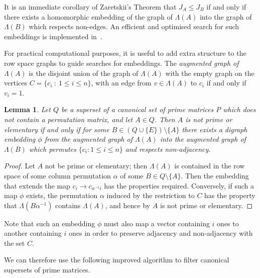 \documentclass[11pt]{article}
\newtheorem{lemma}[thm]{Lemma}
\numberwithin{equation}{section}
\renewcommand{\to}{\longrightarrow}
\newcommand{\RowS}{\Lambda}
\begin{document}
It is an immediate corollary of Zaretskii's Theorem that $J_A \leq J_B$ if and
only if there exists a homomorphic embedding of the graph of $\RowS(A)$ into the
graph of $\RowS(B)$ which respects non-edges. An efficient and optimised search
for such embeddings is implemented in~\cite{Digraphs2020aa}.

For practical computational purposes, it is useful to add extra structure to the
row space graphs to guide searches for embeddings. The \emph{augmented graph of
  $\RowS(A)$} is the disjoint union of the graph of $\RowS(A)$ with the empty
graph on the vertices $C = \{c_i \: : \: 1 \leq i \leq n\}$, with an edge from
$v \in \RowS(A)$ to $c_i$ if and only if $v_i = 1$.

\begin{lemma}
  Let $Q$ be a superset of a canonical set of prime matrices $P$ which does not
  contain a permutation matrix, and let $A \in
  Q$. Then $A$ is not prime or elementary if and only if for some $B \in
  (Q\cup\{E\})\setminus\{A\}$ there exists a digraph embedding $\phi$ from the
  augmented graph of $\RowS(A)$ into the augmented graph of $\RowS(B)$ which
  permutes $\{ c_i : 1 \leq i \leq n \}$ and respects non-adjacency.
\end{lemma}
\begin{proof}
  Let $A$ not be prime or elementary; then $\RowS(A)$ is contained in the row
  space of some column permutation $\alpha$ of some $B \in Q \setminus \{A\}$.
  Then the embedding that extends the map $c_i \to c_{\alpha^{-1}i}$ has the
  properties required. Conversely, if such a map $\phi$ exists, the permutation
  $\alpha$ induced by the restriction to $C$ has the property that
  $\RowS(B\alpha^{-1})$ contains $\RowS(A)$, and hence by
   $A$ is not prime or elementary. 
\end{proof}

Note that such an embedding $\phi$ must also map a vector containing $i$ ones to
another containing $i$ ones in order to preserve adjacency and non-adjacency
with the set $C$.

We can therefore use the following improved algorithm to filter canonical
supersets of prime matrices.
\end{document}
